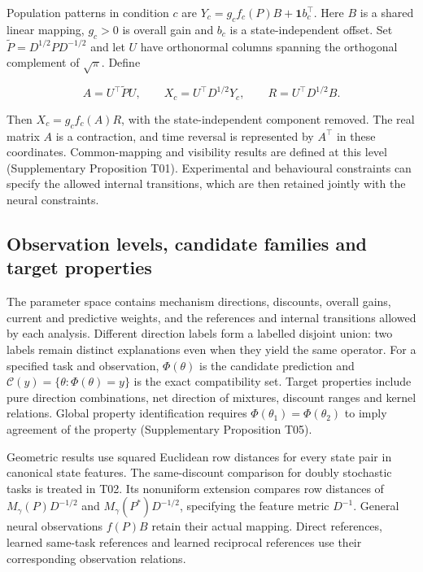\documentclass[11pt,a4paper]{article}
\begin{document}
\par
\noindent\begin{minipage}{\linewidth}

Population patterns in condition \(c\) are
\(Y_c=g_cf_c(P)B+\mathbf1b_c^\top\). Here \(B\) is a shared linear
mapping, \(g_c>0\) is overall gain and \(b_c\) is a state-independent
offset. Set \(\widetilde P=D^{1/2}PD^{-1/2}\) and let \(U\) have
orthonormal columns spanning the orthogonal complement of \(\sqrt\pi\).
Define

\[
A=U^\top\widetilde P U,\qquad
X_c=U^\top D^{1/2}Y_c,\qquad
R=U^\top D^{1/2}B.
\]

\end{minipage}\par

Then \(X_c=g_cf_c(A)R\), with the state-independent component removed.
The real matrix \(A\) is a contraction, and time reversal is represented
by \(A^\top\) in these coordinates. Common-mapping and visibility
results are defined at this level (Supplementary Proposition T01).
Experimental and behavioural constraints can specify the allowed
internal transitions, which are then retained jointly with the neural
constraints.

\subsection{Observation levels, candidate families and target
properties}\label{observation-levels-candidate-families-and-target-properties}

The parameter space contains mechanism directions, discounts, overall
gains, current and predictive weights, and the references and internal
transitions allowed by each analysis. Different direction labels form a
labelled disjoint union: two labels remain distinct explanations even
when they yield the same operator. For a specified task and observation,
\(\Phi(\theta)\) is the candidate prediction and
\(\mathcal C(y)=\{\theta:\Phi(\theta)=y\}\) is the exact compatibility
set. Target properties include pure direction combinations, net
direction of mixtures, discount ranges and kernel relations. Global
property identification requires \(\Phi(\theta_1)=\Phi(\theta_2)\) to
imply agreement of the property (Supplementary Proposition T05).

Geometric results use squared Euclidean row distances for every state
pair in canonical state features. The same-discount comparison for
doubly stochastic tasks is treated in T02. Its nonuniform extension
compares row distances of \(M_\gamma(P)D^{-1/2}\) and
\(M_\gamma(P^*)D^{-1/2}\), specifying the feature metric \(D^{-1}\).
General neural observations \(f(P)B\) retain their actual mapping.
Direct references, learned same-task references and learned reciprocal
references use their corresponding observation relations.
\end{document}
